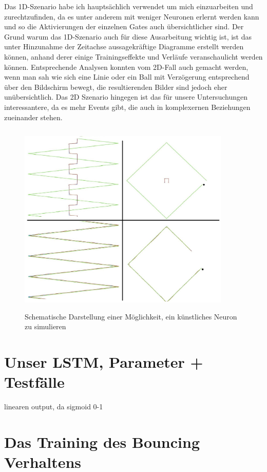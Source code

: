 Das 1D-Szenario habe ich hauptsächlich verwendet um mich einzuarbeiten und zurechtzufinden, da es unter anderem mit weniger Neuronen erlernt werden kann und so die Aktivierungen der einzelnen Gates auch übersichtlicher sind. Der Grund warum das 1D-Szenario auch für diese Ausarbeitung wichtig ist, ist das unter Hinzunahme der Zeitachse aussagekräftige Diagramme erstellt werden können, anhand derer einige Trainingseffekte und Verläufe veranschaulicht werden können. Entsprechende Analysen konnten vom 2D-Fall auch gemacht werden, wenn man sah wie sich eine Linie oder ein Ball mit Verzögerung entsprechend über den Bildschirm bewegt, die resultierenden Bilder sind jedoch eher unübersichtlich. Das 2D Szenario hingegen ist das für unsere Untersuchungen interessantere, da es mehr Events gibt, die auch in komplexernen Beziehungen zueinander stehen.
\begin{figure}
	\centering
	\includegraphics[width=0.9\textwidth, height=350px]{pics/1dvs2d.jpg}	
	\caption{Schematische Darstellung einer Möglichkeit, ein künstliches Neuron zu simulieren}
	\label{img:aneuron}
\end{figure}

\section{Unser LSTM, Parameter + Testfälle}
linearen output, da sigmoid 0-1


\section{Das Training des Bouncing Verhaltens}




